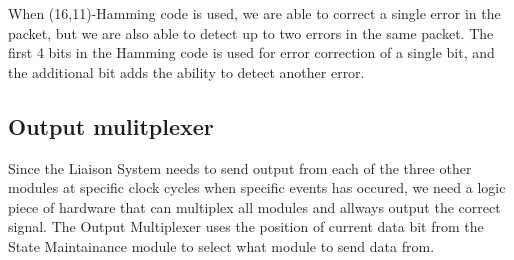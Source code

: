 When (16,11)-Hamming code is used, we are able to correct a single
error in the packet, but we are also able to detect up to two errors
in the same packet.  The first 4 bits in the Hamming code is used for
error correction of a single bit, and the additional bit adds the
ability to detect another error.

\subsection{Output mulitplexer}
Since the Liaison System needs to send output from each of the three other modules at specific clock cycles when specific events has occured, we need
a logic piece of hardware that can multiplex all modules and allways output the correct signal. The Output Multiplexer uses the position of current data bit
from the State Maintainance module to select what module to send data from.

